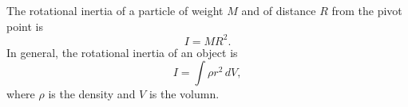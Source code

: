 \documentclass{article}
\begin{document}



\noindent
The rotational inertia of a particle of weight $M$ and of distance $R$ from the pivot point is
\[
    I = MR^2.
\]
In general, the rotational inertia of an object is
\[
    I = \int \rho r^2 \, dV,
\]
where $\rho$ is the density and $V$ is the volumn.

\vspace{2cm}
\end{document}
